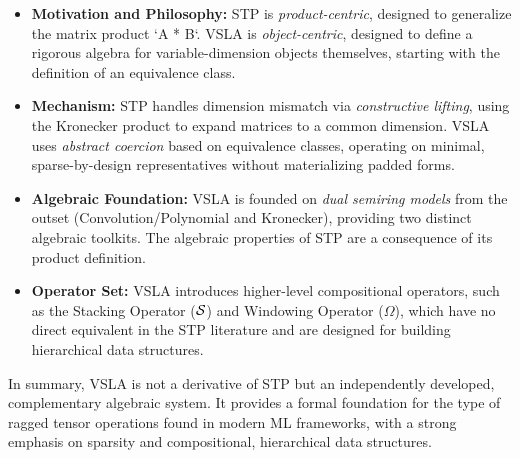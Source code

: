 \begin{itemize}
    \item \textbf{Motivation and Philosophy:} STP is \textit{product-centric}, designed to generalize the matrix product `A * B`. VSLA is \textit{object-centric}, designed to define a rigorous algebra for variable-dimension objects themselves, starting with the definition of an equivalence class.
    \item \textbf{Mechanism:} STP handles dimension mismatch via \textit{constructive lifting}, using the Kronecker product to expand matrices to a common dimension. VSLA uses \textit{abstract coercion} based on equivalence classes, operating on minimal, sparse-by-design representatives without materializing padded forms.
    \item \textbf{Algebraic Foundation:} VSLA is founded on \textit{dual semiring models} from the outset (Convolution/Polynomial and Kronecker), providing two distinct algebraic toolkits. The algebraic properties of STP are a consequence of its product definition.
    \item \textbf{Operator Set:} VSLA introduces higher-level compositional operators, such as the Stacking Operator ($\mathcal{S}$) and Windowing Operator ($\Omega$), which have no direct equivalent in the STP literature and are designed for building hierarchical data structures.
\end{itemize}

In summary, VSLA is not a derivative of STP but an independently developed, complementary algebraic system. It provides a formal foundation for the type of ragged tensor operations found in modern ML frameworks, with a strong emphasis on sparsity and compositional, hierarchical data structures.
